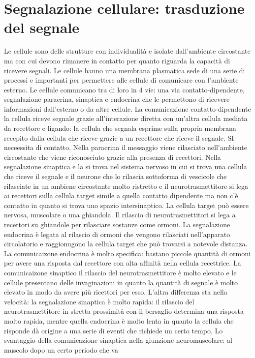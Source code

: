 \chapter{Segnalazione cellulare: trasduzione del segnale}
Le cellule sono delle strutture con individualit\`a e isolate dall'ambiente circostante ma con cui devono rimanere in contatto per quanto riguarda la capacit\`a di ricevere segnali.
Le cellule hanno una membrana plasmatica sede di una serie di processi e importanti per permettere alle cellule di comunicare con l'ambiente esterno. Le cellule comunicano tra di loro
in 4 vie: una via contatto-dipendente, segnalazione paracrina, sinaptica e endocrina che le permettono di ricevere informazioni dall'esterno o da altre cellule. La comunicazione 
contatto-dipendente la cellula riceve segnale grazie all'interazione diretta con un'altra cellula mediata da recettore e ligando: la cellula che segnala esprime sulla propria membrana
recepito dalla cellula che riceve grazie a un recettore che riceve il segnale. SI neceessita di contatto. Nella paracrina il messaggio viene rilasciato nell'ambiente circostante che 
viene riconosciuto grazie alla presenza di recettori. Nella segnalazione sinaptica e la si trova nel sistema nervoso in cui si trova una cellula che riceve il segnale e il neurone che
lo rilascia sottoforma di vescicole che rilasciate in un ambiene circostante molto ristretto e il neurotrasmettitore si lega ai recettori sulla cellula target simile a quella contatto 
dipendente ma non c'\`e contatto in quanto si trova uno spazio intersinaptico. La cellula target pu\`o essere nervosa, muscolare o una ghiandola. Il rilascio di neurotrasmettitori si 
lega a recettori su ghiandole per rilasciare sostanze come ormoni. La segnalazione endocrina \`e legata al rilascio di ormoni che vengono rilasciati nell'apparato circolatorio e 
raggionugono la cellula target che pu\`o trovarsi a notevole distanza. La comunicaizone endocrina \`e molto specifica: bastano piccole quantit\`a di ormoni per avere una risposta dal
recettore con alta affinit\`a nella cellula recettrice. La comunicaizone sinaptico il rilascio del neurotrasmettitore \`e molto elevato e le cellule presentano delle invaginazioni in 
quanto la quantit\`a di segnale \`e molto elevato in modo da avere pi\`u ricettori per esso. L'altra differenza sta nella velocit\`a: la segnalazione sinaptica \`e molto rapida: il 
rilascio del neurotrasmettitore in stretta prossimit\`a con il bersaglio determina una risposta molto rapida, mentre quella endocrina \`e molto lenta in quanto la cellula che risponde
d\`a origine a una serie di eventi che richiede un certo tempo. Lo svantaggio della comunicazione sinaptica nella giunzione neuromuscolare: al muscolo dopo un certo periodo che va 

